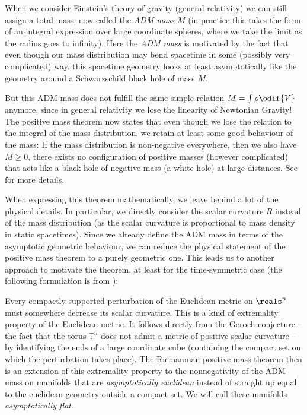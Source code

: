 \documentclass[titlepage,numbers=noenddot,oneside,%
cleardoublepage=empty,paper=a4,fontsize=11pt,%
english,%
]{scrartcl}
\begin{document}
When we consider Einstein's theory of gravity (\ie general relativity) we can still assign a total mass, now called the \emph{ADM mass} \( M \) (in practice this takes the form of an integral expression over large coordinate spheres, where we take the limit as the radius goes to infinity). Here the \emph{ADM mass} is motivated by the fact that even though our mass distribution may bend spacetime in some (possibly very complicated) way, this spacetime geometry looks at least asymptotically like the geometry around a Schwarzschild black hole of mass \( M \).

But this ADM mass does not fulfill the same simple relation \( M=\int \rho\odif{V} \) anymore, since in general relativity we lose the linearity of Newtonian Gravity! The positive mass theorem now states that even though we lose the relation to the integral of the mass distribution, we retain at least some good behaviour of the mass: If the mass distribution is non-negative everywhere, then we also have \( M\geq 0 \), \ie there exists no configuration of positive masses (however complicated) that acts like a black hole of negative mass (a white hole) at large distances. See \cite[Chapter 7]{leeGeometricRelativity2019} for more details.

When expressing this theorem mathematically, we leave behind a lot of the physical details. In particular, we directly consider the scalar curvature \( R \) instead of the mass distribution (as the scalar curvature is proportional to mass density in static spacetimes). Since we already define the ADM mass in terms of the asymptotic geometric behaviour, we can reduce the physical statement of the positive mass theorem to a purely geometric one. This leads us to another approach to motivate the theorem, at least for the time-symmetric case (the following formulation is from \cite[1]{braySpacetimeHarmonicFunctions2021}):

Every compactly supported perturbation of the Euclidean metric on \( \reals^n \) must somewhere decrease its scalar curvature. This is a kind of extremality property of the Euclidean metric. It follows directly from the Geroch conjecture -- the fact that the torus \( \mathbb{T}^n \) does not admit a metric of positive scalar curvature -- by identifying the ends of a large coordinate cube (containing the compact set on which the perturbation takes place). The Riemannian positive mass theorem then is an extension of this extremality property to the nonnegativity of the ADM-mass on manifolds that are \emph{asymptotically euclidean} instead of straight up equal to the euclidean geometry outside a compact set. We will call these manifolds \emph{asymptotically flat}.
\end{document}
